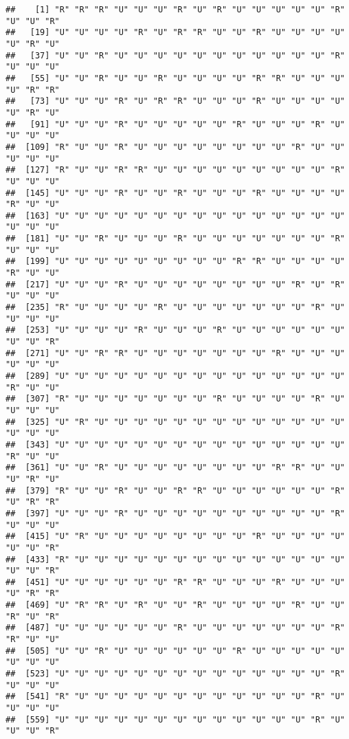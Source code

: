 \documentclass[
]{article}
\begin{document}
\begin{verbatim}
##    [1] "R" "R" "R" "U" "U" "U" "R" "U" "R" "U" "U" "U" "U" "U" "R" "U" "U" "R"
##   [19] "U" "U" "U" "U" "R" "U" "R" "R" "U" "U" "R" "U" "U" "U" "U" "U" "R" "U"
##   [37] "U" "U" "R" "U" "U" "U" "U" "U" "U" "U" "U" "U" "U" "U" "R" "U" "U" "U"
##   [55] "U" "U" "R" "U" "U" "R" "U" "U" "U" "U" "R" "R" "U" "U" "U" "U" "R" "R"
##   [73] "U" "U" "U" "R" "U" "R" "R" "U" "U" "U" "R" "U" "U" "U" "U" "U" "R" "U"
##   [91] "U" "U" "U" "R" "U" "U" "U" "U" "U" "R" "U" "U" "U" "R" "U" "U" "U" "U"
##  [109] "R" "U" "U" "R" "U" "U" "U" "U" "U" "U" "U" "U" "R" "U" "U" "U" "U" "U"
##  [127] "R" "U" "U" "R" "R" "U" "U" "U" "U" "U" "U" "U" "U" "U" "R" "U" "U" "U"
##  [145] "U" "U" "U" "R" "U" "U" "R" "U" "U" "U" "R" "U" "U" "U" "U" "R" "U" "U"
##  [163] "U" "U" "U" "U" "U" "U" "U" "U" "U" "U" "U" "U" "U" "U" "U" "U" "U" "U"
##  [181] "U" "U" "R" "U" "U" "U" "R" "U" "U" "U" "U" "U" "U" "U" "R" "U" "U" "U"
##  [199] "U" "U" "U" "U" "U" "U" "U" "U" "U" "R" "R" "U" "U" "U" "U" "R" "U" "U"
##  [217] "U" "U" "U" "R" "U" "U" "U" "U" "U" "U" "U" "U" "R" "U" "R" "U" "U" "U"
##  [235] "R" "U" "U" "U" "U" "R" "U" "U" "U" "U" "U" "U" "U" "R" "U" "U" "U" "U"
##  [253] "U" "U" "U" "U" "R" "U" "U" "U" "R" "U" "U" "U" "U" "U" "U" "U" "U" "R"
##  [271] "U" "U" "R" "R" "U" "U" "U" "U" "U" "U" "U" "R" "U" "U" "U" "U" "U" "U"
##  [289] "U" "U" "U" "U" "U" "U" "U" "U" "U" "U" "U" "U" "U" "U" "U" "R" "U" "U"
##  [307] "R" "U" "U" "U" "U" "U" "U" "U" "R" "U" "U" "U" "U" "R" "U" "U" "U" "U"
##  [325] "U" "R" "U" "U" "U" "U" "U" "U" "U" "U" "U" "U" "U" "U" "U" "U" "U" "U"
##  [343] "U" "U" "U" "U" "U" "U" "U" "U" "U" "U" "U" "U" "U" "U" "U" "R" "U" "U"
##  [361] "U" "U" "R" "U" "U" "U" "U" "U" "U" "U" "U" "R" "R" "U" "U" "U" "R" "U"
##  [379] "R" "U" "U" "R" "U" "U" "R" "R" "U" "U" "U" "U" "U" "U" "R" "U" "R" "R"
##  [397] "U" "U" "U" "R" "U" "U" "U" "U" "U" "U" "U" "U" "U" "U" "R" "U" "U" "U"
##  [415] "U" "R" "U" "U" "U" "U" "U" "U" "U" "U" "R" "U" "U" "U" "U" "U" "U" "R"
##  [433] "R" "U" "U" "U" "U" "U" "U" "U" "U" "U" "U" "U" "U" "U" "U" "U" "U" "R"
##  [451] "U" "U" "U" "U" "U" "U" "R" "R" "U" "U" "U" "R" "U" "U" "U" "U" "R" "R"
##  [469] "U" "R" "R" "U" "R" "U" "U" "R" "U" "U" "U" "U" "R" "U" "U" "R" "U" "R"
##  [487] "U" "U" "U" "U" "U" "U" "R" "U" "U" "U" "U" "U" "U" "U" "R" "R" "U" "U"
##  [505] "U" "U" "R" "U" "U" "U" "U" "U" "U" "R" "U" "U" "U" "U" "U" "U" "U" "U"
##  [523] "U" "U" "U" "U" "U" "U" "U" "U" "U" "U" "U" "U" "U" "U" "R" "U" "U" "U"
##  [541] "R" "U" "U" "U" "U" "U" "U" "U" "U" "U" "U" "U" "U" "R" "U" "U" "U" "U"
##  [559] "U" "U" "U" "U" "U" "U" "U" "U" "U" "U" "U" "U" "U" "R" "U" "U" "U" "R"

\end{verbatim}
\end{document}
